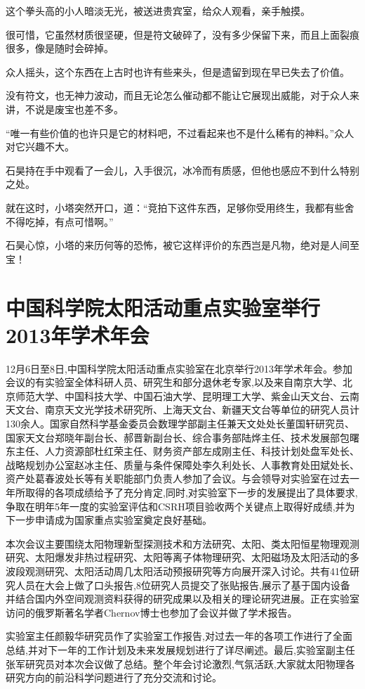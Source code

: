 这个拳头高的小人暗淡无光，被送进贵宾室，给众人观看，亲手触摸。

很可惜，它虽然材质很坚硬，但是符文破碎了，没有多少保留下来，而且上面裂痕很多，像是随时会碎掉。

众人摇头，这个东西在上古时也许有些来头，但是遗留到现在早已失去了价值。

没有符文，也无神力波动，而且无论怎么催动都不能让它展现出威能，对于众人来讲，不说是废宝也差不多。

“唯一有些价值的也许只是它的材料吧，不过看起来也不是什么稀有的神料。”众人对它兴趣不大。

石昊持在手中观看了一会儿，入手很沉，冰冷而有质感，但他也感应不到什么特别之处。

就在这时，小塔突然开口，道：“竞拍下这件东西，足够你受用终生，我都有些舍不得吃掉，有点可惜啊。”

石昊心惊，小塔的来历何等的恐怖，被它这样评价的东西岂是凡物，绝对是人间至宝！

\chapter{中国科学院太阳活动重点实验室举行2013年学术年会}

12月6日至8日,中国科学院太阳活动重点实验室在北京举行2013年学术年会。参加会议的有实验室全体科研人员、研究生和部分退休老专家,以及来自南京大学、北京师范大学、中国科技大学、中国石油大学、昆明理工大学、紫金山天文台、云南天文台、南京天文光学技术研究所、上海天文台、新疆天文台等单位的研究人员计130余人。国家自然科学基金委员会数理学部副主任兼天文处处长董国轩研究员、国家天文台郑晓年副台长、郝晋新副台长、综合事务部陆烨主任、技术发展部包曙东主任、人力资源部杜红荣主任、财务资产部左成刚主任、科技计划处盘军处长、战略规划办公室赵冰主任、质量与条件保障处李久利处长、人事教育处田斌处长、资产处葛春波处长等有关职能部门负责人参加了会议。与会领导对实验室在过去一年所取得的各项成绩给予了充分肯定,同时,对实验室下一步的发展提出了具体要求,争取在明年5年一度的实验室评估和CSRH项目验收两个关键点上取得好成绩,并为下一步申请成为国家重点实验室奠定良好基础。 

本次会议主要围绕太阳物理新型探测技术和方法研究、太阳、类太阳恒星物理观测研究、太阳爆发非热过程研究、太阳等离子体物理研究、太阳磁场及太阳活动的多波段观测研究、太阳活动周几太阳活动预报研究等方向展开深入讨论。共有41位研究人员在大会上做了口头报告,8位研究人员提交了张贴报告,展示了基于国内设备并结合国内外空间观测资料获得的研究成果以及相关的理论研究进展。正在实验室访问的俄罗斯著名学者Chernov博士也参加了会议并做了学术报告。 

实验室主任颜毅华研究员作了实验室工作报告,对过去一年的各项工作进行了全面总结,并对下一年的工作计划及未来发展规划进行了详尽阐述。最后,实验室副主任张军研究员对本次会议做了总结。整个年会讨论激烈,气氛活跃,大家就太阳物理各研究方向的前沿科学问题进行了充分交流和讨论。